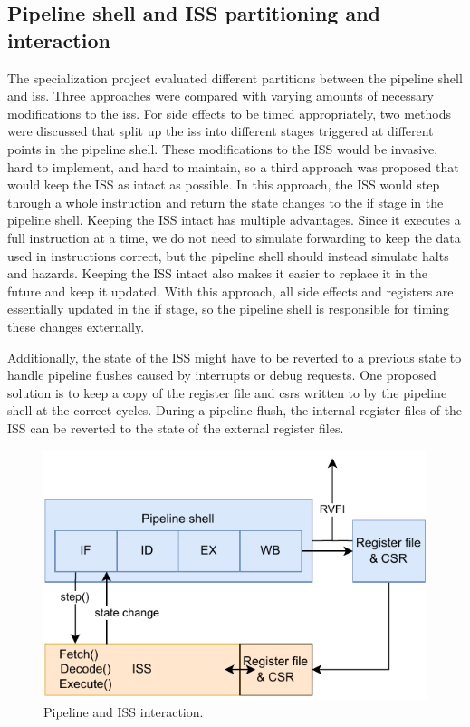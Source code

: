 \subsection{Pipeline shell and ISS partitioning and interaction}
\label{sec:pw_partition}

The specialization project evaluated different partitions between the pipeline shell and \acrshort{iss}. Three approaches were compared with varying amounts of necessary modifications to the \acrshort{iss}. For side effects to be timed appropriately, two methods were discussed that split up the \acrshort{iss} into different stages triggered at different points in the pipeline shell. These modifications to the ISS would be invasive, hard to implement, and hard to maintain, so a third approach was proposed that would keep the ISS as intact as possible. In this approach, the ISS would step through a whole instruction and return the state changes to the \acrshort{if} stage in the pipeline shell. Keeping the ISS intact has multiple advantages. Since it executes a full instruction at a time, we do not need to simulate forwarding to keep the data used in instructions correct, but the pipeline shell should instead simulate halts and hazards. Keeping the ISS intact also makes it easier to replace it in the future and keep it updated. With this approach, all side effects and registers are essentially updated in the \acrshort{if} stage, so the pipeline shell is responsible for timing these changes externally.

Additionally, the state of the ISS might have to be reverted to a previous state to handle pipeline flushes caused by interrupts or debug requests. One proposed solution is to keep a copy of the register file and \acrshort{csr}s written to by the pipeline shell at the correct cycles. During a pipeline flush, the internal register files of the ISS can be reverted to the state of the external register files.


\begin{figure}[htb]
    \centering
    \includegraphics[width=0.5\linewidth]{figures/pipeline-iss-3.pdf}
    \caption{Pipeline and ISS interaction.}
    \label{fig:pipeline-iss-3}
\end{figure}

